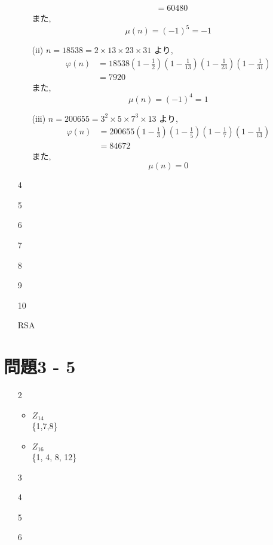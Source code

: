 \documentclass[12pt,a4paper]{jsarticle}
\begin{document}
\begin{enumerate}
\begin{itemize}
\begin{align*}
 &= 60480
 \end{align*}
 また,
 \[\mu(n) = (-1)^5 = -1 \]
 \item[(ii)]
 $n = 18538 = 2 \times 13 \times 23 \times 31$ より,
 \begin{align*}
 \varphi(n) &= 18538 \left(1-\frac{1}{2}\right) \left(1-\frac{1}{13}\right)
   \left(1-\frac{1}{23}\right) \left(1-\frac{1}{31}\right) \\
 &= 7920
 \end{align*}
 また,
 \[\mu(n) = (-1)^4 = 1 \]
 \item[(iii)]
 $n = 200655 = 3^2 \times 5 \times 7^3 \times 13$ より,
 \begin{align*}
 \varphi(n) &= 200655 \left(1-\frac{1}{3}\right) \left(1-\frac{1}{5}\right)
   \left(1-\frac{1}{7}\right) \left(1-\frac{1}{13}\right) \\
 &= 84672
 \end{align*}
 また,
 \[\mu(n) = 0 \]
 \end{itemize}
 \item[4]  \mbox{} \\
 \item[5]  \mbox{} \\
 \item[6]  \mbox{} \\
 \item[7]  \mbox{} \\
 \item[8]  \mbox{} \\
 \item[9]  \mbox{} \\
 \item[10]  \mbox{} \\
 \item[RSA]  \mbox{} \\
\end{enumerate}
\pagebreak


\section*{問題3 - 5}
\begin{enumerate}
 \item[2]  \mbox{} \\
	\begin{itemize}
		\item $Z_{14}$ \\
			\{1,7,8\}
		\item $Z_{16}$ \\
			\{1, 4, 8, 12\}
	\end{itemize}
 \item[3]  \mbox{} \\
 \item[4]  \mbox{} \\
 \item[5]  \mbox{} \\
 \item[6]  \mbox{} \\
\end{enumerate}
\pagebreak
\end{document}
